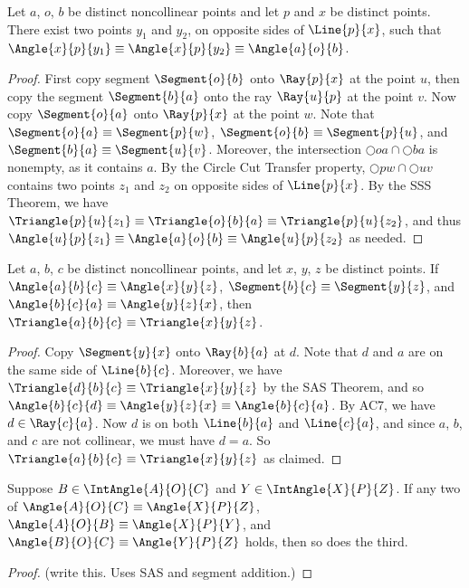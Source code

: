 \documentclass{article}
\begin{document}
\begin{construct}
Let $a$, $o$, $b$ be distinct noncollinear points and let $p$ and $x$ be distinct points. There exist two points $y_1$ and $y_2$, on opposite sides of $\Line{p}{x}$, such that $\Angle{x}{p}{y_1} \equiv \Angle{x}{p}{y_2} \equiv \Angle{a}{o}{b}$. 
\end{construct}

\begin{proof}
First copy segment $\Segment{o}{b}$ onto $\Ray{p}{x}$ at the point $u$, then copy the segment $\Segment{b}{a}$ onto the ray $\Ray{u}{p}$ at the point $v$. Now copy $\Segment{o}{a}$ onto $\Ray{p}{x}$ at the point $w$. Note that $\Segment{o}{a} \equiv \Segment{p}{w}$, $\Segment{o}{b} \equiv \Segment{p}{u}$, and $\Segment{b}{a} \equiv \Segment{u}{v}$. Moreover, the intersection $\Circle{o}{a} \cap \Circle{b}{a}$ is nonempty, as it contains $a$. By the Circle Cut Transfer property, $\Circle{p}{w} \cap \Circle{u}{v}$ contains two points $z_1$ and $z_2$ on opposite sides of $\Line{p}{x}$. By the SSS Theorem, we have $\Triangle{p}{u}{z_1} \equiv \Triangle{o}{b}{a} \equiv \Triangle{p}{u}{z_2}$, and thus $\Angle{u}{p}{z_1} \equiv \Angle{a}{o}{b} \equiv \Angle{u}{p}{z_2}$ as needed.
\end{proof}

\begin{prop}
Let $a$, $b$, $c$ be distinct noncollinear points, and let $x$, $y$, $z$ be distinct points. If $\Angle{a}{b}{c} \equiv \Angle{x}{y}{z}$, $\Segment{b}{c} \equiv \Segment{y}{z}$, and $\Angle{b}{c}{a} \equiv \Angle{y}{z}{x}$, then $\Triangle{a}{b}{c} \equiv \Triangle{x}{y}{z}$.
\end{prop}

\begin{proof}
Copy $\Segment{y}{x}$ onto $\Ray{b}{a}$ at $d$. Note that $d$ and $a$ are on the same side of $\Line{b}{c}$. Moreover, we have $\Triangle{d}{b}{c} \equiv \Triangle{x}{y}{z}$ by the SAS Theorem, and so $\Angle{b}{c}{d} \equiv \Angle{y}{z}{x} \equiv \Angle{b}{c}{a}$. By AC7, we have $d \in \Ray{c}{a}$. Now $d$ is on both $\Line{b}{a}$ and $\Line{c}{a}$, and since $a$, $b$, and $c$ are not collinear, we must have $d = a$. So $\Triangle{a}{b}{c} \equiv \Triangle{x}{y}{z}$ as claimed.
\end{proof}

\begin{prop}
Suppose $B \in \IntAngle{A}{O}{C}$ and $Y \in \IntAngle{X}{P}{Z}$. If any two of $\Angle{A}{O}{C} \equiv \Angle{X}{P}{Z}$, $\Angle{A}{O}{B} \equiv \Angle{X}{P}{Y}$, and $\Angle{B}{O}{C} \equiv \Angle{Y}{P}{Z}$ holds, then so does the third.
\end{prop}

\begin{proof}
(write this. Uses SAS and segment addition.)
\end{proof}
\end{document}
